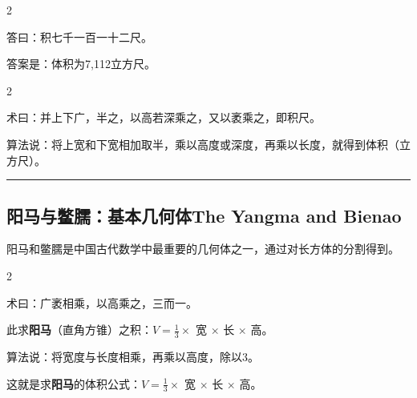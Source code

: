 \documentclass[11pt,a4paper]{article}
\newcommand{\longline}{\noindent\rule{\textwidth}{0.4pt}}
\newcommand{\bilingualsubsection}[2]{%
  \subsection{#1\hfill\normalfont\normalsize\color{sectioncolor}#2}%
}
\begin{document}
\vspace{0.2cm}

\begin{paracol}{2}

\begin{answerbox}[\CJKfamily{rm}答 · 原文]
答曰：积七千一百一十二尺。
\end{answerbox}

\switchcolumn

\begin{answerbox}[白话文：答案]
答案是：体积为7,112立方尺。
\end{answerbox}

\end{paracol}

\vspace{0.2cm}

\begin{paracol}{2}

\begin{methodbox}[\CJKfamily{rm}术 · 原文]
术曰：并上下广，半之，以高若深乘之，又以袤乘之，即积尺。
\end{methodbox}

\switchcolumn

\begin{methodbox}
算法说：将上宽和下宽相加取半，乘以高度或深度，再乘以长度，就得到体积（立方尺）。
\end{methodbox}

\end{paracol}

\vspace{0.5cm}
\longline
\vspace{0.3cm}

\bilingualsubsection{阳马与鳖臑：基本几何体}{The Yangma and Bienao}

阳马和鳖臑是中国古代数学中最重要的几何体之一，通过对长方体的分割得到。

\begin{paracol}{2}

\begin{methodbox}
术曰：广袤相乘，以高乘之，三而一。

\vspace{0.3em}
此求\textbf{阳马}（直角方锥）之积：$V = \frac{1}{3} \times$ 宽 $\times$ 长 $\times$ 高。
\end{methodbox}

\switchcolumn

\begin{methodbox}
算法说：将宽度与长度相乘，再乘以高度，除以3。

\vspace{0.3em}
这就是求\textbf{阳马}的体积公式：$V = \frac{1}{3} \times$ 宽 $\times$ 长 $\times$ 高。
\end{methodbox}

\end{paracol}
\end{document}
